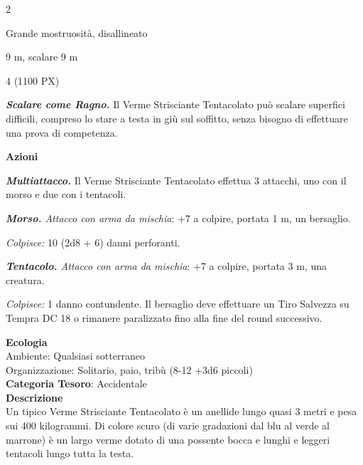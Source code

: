 \begin{multicols}{2}
{
\begin{description}[noitemsep, topsep=0pt, parsep=0pt, partopsep=0pt, itemsep=1pt, leftmargin=2.35cm,  labelwidth=2.2cm, itemindent=0cm, listparindent=0pt] %
\setlength{\baselineskip}{10pt}
\item[\textbf{Taglia/Tipo}] Grande mostruosità, disallineato
\item[\textbf{Caratt.}] 
\item[\textbf{Punti Ferita}] 
\item[\textbf{Movimento}] 9 m, scalare 9 m
\item[\textbf{Tiri Salvez.}] 
\item[\textbf{Sensi}] 
\item[\textbf{Sfida}] 4 (1100 PX)
\end{description}
\smallskip

\emph{\textbf{Scalare come Ragno.}} Il Verme Strisciante Tentacolato può scalare superfici difficili, compreso lo stare a testa in giù sul soffitto, senza bisogno di effettuare una prova di competenza.

\textbf{Azioni}

\emph{\textbf{Multiattacco.}} Il Verme Strisciante Tentacolato effettua 3 attacchi, uno con il morso e due con i tentacoli.

\emph{\textbf{Morso.} Attacco con arma da mischia}: +7 a colpire, portata 1 m, un bersaglio.

\emph{Colpisce:} 10 (2d8 + 6) danni perforanti.

\emph{\textbf{Tentacolo.} Attacco con arma da mischia}: +7 a colpire, portata 3 m, una creatura.

\emph{Colpisce:} 1 danno contundente. Il bersaglio deve effettuare un Tiro Salvezza su Tempra DC 18 o rimanere paralizzato fino alla fine del round successivo.

\textbf{Ecologia}\\
Ambiente: Qualsiasi sotterraneo\\
Organizzazione: Solitario, paio, tribù (8-12 +3d6 piccoli)\\
\textbf{Categoria Tesoro}: Accidentale\\
\textbf{Descrizione}\\
Un tipico Verme Strisciante Tentacolato è un anellide lungo quasi 3 metri e pesa sui 400 kilogrammi. Di colore scuro (di varie gradazioni dal blu al verde al marrone) è un largo verme dotato di una possente bocca e lunghi e leggeri tentacoli lungo tutta la testa.

}
\end{multicols}
